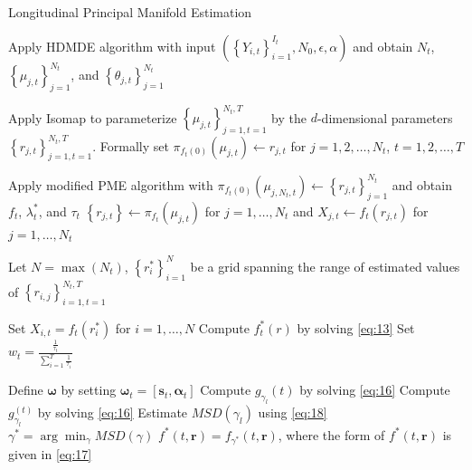 \documentclass[11pt,reqno]{article}
\theoremstyle{definition}
\begin{document}
\begin{algorithm}
\caption{Longitudinal Principal Manifold Estimation}\label{alg:lpme}
 {
  Apply HDMDE algorithm with input $\left(\left\{Y_{i, t}\right\}_{i = 1}^{I_t}, N_0, \epsilon, \alpha\right)$ and obtain $N_t$, $\left\{\mu_{j, t}\right\}_{j = 1}^{N_t}$, and $\left\{\theta_{j, t}\right\}_{j = 1}^{N_t}$\;
}

  Apply Isomap to parameterize $\left\{\mu_{j, t}\right\}_{j = 1, t = 1}^{N_t, T}$ by the $d$-dimensional parameters $\left\{r_{j, t}\right\}_{j = 1, t = 1}^{N_t, T}$. Formally set $\pi_{f_t(0)}(\mu_{j, t}) \gets r_{j, t}$ for $j = 1, 2, \dots, N_t$, $t = 1, 2, \dots, T$\;

 {
  Apply modified PME algorithm with $\pi_{f_t(0)}(\mu_{j, N_t, t}) \gets \left\{r_{j, t}\right\}_{j = 1}^{N_t}$ and obtain $f_t$, $\lambda_t^*$, and $\tau_t$\;
  $\left\{r_{j, t}\right\} \gets \pi_{f_t}(\mu_{j, t})$ for $j = 1, \dots, N_t$ and $X_{j, t} \gets f_t(r_{j, t})$ for $j = 1, \dots, N_t$\;
}

  Let $N = \max(N_t)$, $\left\{r_i^*\right\}_{i=1}^{N}$ be a grid spanning the range of estimated values of $\left\{r_{i, j}\right\}_{i=1, t=1}^{N_t, T}$\; 

 {
  Set $X_{i, t} = f_t(r_{i}^*)$ for $i = 1, \dots, N$\;
  Compute $f_t^*(r)$ by solving \eqref{eq:13}\;
  Set $w_t = \frac{\frac{1}{\tau_t}}{\sum_{i=1}^{T}\frac{1}{\tau_i}}$\;
}

  Define $\boldsymbol{\omega}$ by setting $\boldsymbol{\omega}_t = \left[\boldsymbol{s}_t, \boldsymbol{\alpha}_t\right]$\;
   {
    Compute $g_{\gamma_l}(t)$ by solving \eqref{eq:16}\;
     {
      Compute $g_{\gamma_l}^{(t)}$ by solving \eqref{eq:16}\;
    }
    Estimate $MSD(\gamma_l)$ using \eqref{eq:18}\;
  }
  $\gamma^* = \arg\min_{\gamma}MSD(\gamma)$\;
  $f^*(t, \boldsymbol{r}) = f_{\gamma^*}(t, \boldsymbol{r})$, where the form of $f^*(t, \boldsymbol{r})$ is given in \eqref{eq:17}
\end{algorithm}
\end{document}
